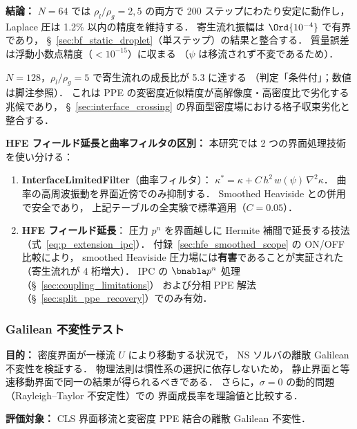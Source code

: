 \noindent\textbf{結論：}
$N = 64$ では $\rho_l/\rho_g = 2, 5$ の両方で 200 ステップにわたり安定に動作し，
Laplace 圧は 1.2\% 以内の精度を維持する．
寄生流れ振幅は $\Ord{10^{-4}}$ で有界であり，
§~\ref{sec:bf_static_droplet}（単ステップ）の結果と整合する．
質量誤差は浮動小数点精度（$< 10^{-15}$）に収まる
（$\psi$ は移流されず不変であるため）．

$N = 128$，$\rho_l/\rho_g = 5$ で寄生流れの成長比が 5.3 に達する
（判定「条件付」；数値は脚注参照）．
これは PPE の変密度近似精度が高解像度・高密度比で劣化する兆候であり，
§~\ref{sec:interface_crossing} の界面型密度場における格子収束劣化と整合する．

\noindent\textbf{HFE フィールド延長と曲率フィルタの区別：}
本研究では 2 つの界面処理技術を使い分ける：
\begin{enumerate}[noitemsep]
  \item \textbf{InterfaceLimitedFilter}（曲率フィルタ）：
        $\kappa^* = \kappa + C\,h^2\,w(\psi)\,\nabla^2\kappa$．
        曲率の高周波振動を界面近傍でのみ抑制する．
        Smoothed Heaviside との併用で安全であり，
        上記テーブルの全実験で標準適用（$C = 0.05$）．
  \item \textbf{HFE フィールド延長}：
        圧力 $p^n$ を界面越しに Hermite 補間で延長する技法（式~\eqref{eq:p_extension_ipc}）．
        付録~\ref{sec:hfe_smoothed_scope} の ON/OFF 比較により，
        smoothed Heaviside 圧力場には\textbf{有害}であることが実証された
        （寄生流れが 4 桁増大）．
        IPC の $\bnabla p^n$ 処理（§~\ref{sec:coupling_limitations}）
        および分相 PPE 解法（§~\ref{sec:split_ppe_recovery}）でのみ有効．
\end{enumerate}

\subsubsection{Galilean 不変性テスト}
\label{sec:galilean_invariance}

\noindent\textbf{目的：}
密度界面が一様流 $U$ により移動する状況で，
NS ソルバの離散 Galilean 不変性を検証する．
物理法則は慣性系の選択に依存しないため，
静止界面と等速移動界面で同一の結果が得られるべきである．
さらに，$\sigma = 0$ の動的問題（Rayleigh--Taylor 不安定性）での
界面成長率を理論値と比較する．

\noindent\textbf{評価対象：}
CLS 界面移流と変密度 PPE 結合の離散 Galilean 不変性．

